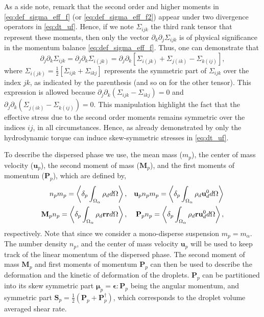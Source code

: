 As a side note, remark that the second order and higher moments in \ref{eq:def_sigma_eff_f} (or \ref{eq:def_sigma_eff_f2}) appear under two divergence operators in \ref{eq:dt_uf}. 
Hence, if we note $\Sigma_{ijk}$ the third rank tensor that represent these moments, then only the vector $\partial_k \partial_j\Sigma_{ijk}$ is of physical significance in the momentum balance \eqref{eq:def_sigma_eff_f}.
Thus, one can demonstrate that \citep{lhuillier1996contribution}
\begin{equation}
    \partial_j \partial_k \Sigma_{ijk}
    = \partial_j \partial_k \Sigma_{i(jk)}
    =
    \partial_j \partial_k \left[
        \Sigma_{i(jk)}
        + \Sigma_{j(ik)}
        - \Sigma_{k(ij)}
    \right],
    \label{eq:sym_proof}
\end{equation}
where $\Sigma_{i(jk)} = \frac{1}{2}[\Sigma_{ijk} + \Sigma_{ikj}]$ represents the symmetric part of $\Sigma_{ijk}$ over the index $jk$, as indicated by the parenthesis (and so on for the other tensor). 
This expression is allowed because $\partial_j \partial_k (\Sigma_{ijk} - \Sigma_{ikj}) = 0$ and $\partial_j \partial_k (\Sigma_{j(ik)} - \Sigma_{k(ij)}) = 0$. 
This manipulation highlight the fact that the effective stress due to the second order moments remains symmetric over the indices $ij$, in all circumstances.
Hence, as already demonstrated by \citet{lhuillier1996contribution} only the hydrodynamic torque can induce skew-symmetric stresses in \ref{eq:dt_uf}. 





To describe the dispersed phase we use, the mean mass ($m_p$), the center of mass velocity ($\textbf{u}_p$), the second moment of mass ($\textbf{M}_p$), and the first moments of momentum ($\textbf{P}_p$),  which are defined by,
\begin{align}
    n_p m_p 
    =
    \left<\delta_{p} \int_{\Omega_{\alpha}} \rho_d d\Omega\right>,
    &&\textbf{u}_p n_p m_p 
    =
    \left<\delta_{p} \int_{\Omega_{\alpha}} \rho_d \textbf{u}_d^0 d\Omega\right>\\
    \textbf{M}_p n_p 
    =
    \left<\delta_{p} \int_{\Omega_{\alpha}} \rho_d \textbf{rr}  d\Omega\right>,
    && \textbf{P}_p n_p 
    =
    \left<\delta_{p} \int_{\Omega_{\alpha}} \rho_d \textbf{r} \textbf{u}_d^0 d\Omega\right>,
\end{align} 
respectively. 
Note that since we consider a mono-disperse suspension $m_p = m_\alpha$. 
The number density $n_p$, and the center of mass velocity $\textbf{u}_p$ will be used to keep track of the linear momentum of the dispersed phase.
The second moment of mass $\textbf{M}_p$ and first moments of momentum $\textbf{P}_p$ can then be used to describe the deformation and the kinetic of deformation of the droplets. 
$\textbf{P}_p$ can be partitioned into its skew symmetric part $\bm\mu_p = \bm\epsilon : \textbf{P}_p$ being the angular momentum, and symmetric part $\textbf{S}_p =\frac{1}{2}(\textbf{P}_p+\textbf{P}_p^\dagger)$, which corresponds to the droplet volume averaged shear rate.
 


